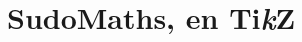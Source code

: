 \documentclass[a4paper,french,11pt]{article}
\providecommand\tikzlogo{Ti\textit{k}Z}
\let\TikZ\tikzlogo
\begin{document}
%
%
%
%
%

\section{SudoMaths, en \TikZ}\label{sudomaths}
\end{document}
